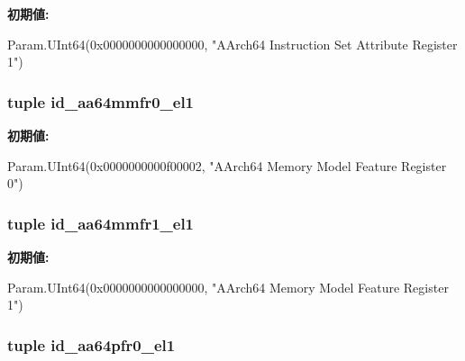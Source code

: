 \label{classArmISA_1_1ArmISA_af6b7dfad4c11bc8baa25694d43bfd3e5}
{\bfseries 初期値:}
\begin{DoxyCode}
Param.UInt64(0x0000000000000000,
        "AArch64 Instruction Set Attribute Register 1")
\end{DoxyCode}
\hypertarget{classArmISA_1_1ArmISA_a9b9694e4a3282d096698500d588e8bbf}{
\subsubsection[{id\_\-aa64mmfr0\_\-el1}]{\setlength{\rightskip}{0pt plus 5cm}tuple {\bf id\_\-aa64mmfr0\_\-el1}}}
\label{classArmISA_1_1ArmISA_a9b9694e4a3282d096698500d588e8bbf}
{\bfseries 初期値:}
\begin{DoxyCode}
Param.UInt64(0x0000000000f00002,
        "AArch64 Memory Model Feature Register 0")
\end{DoxyCode}
\hypertarget{classArmISA_1_1ArmISA_a9d4cea762de219858576fe1aead51b89}{
\subsubsection[{id\_\-aa64mmfr1\_\-el1}]{\setlength{\rightskip}{0pt plus 5cm}tuple {\bf id\_\-aa64mmfr1\_\-el1}}}
\label{classArmISA_1_1ArmISA_a9d4cea762de219858576fe1aead51b89}
{\bfseries 初期値:}
\begin{DoxyCode}
Param.UInt64(0x0000000000000000,
        "AArch64 Memory Model Feature Register 1")
\end{DoxyCode}
\hypertarget{classArmISA_1_1ArmISA_a97479937aaafcc7638ff69bdb8ef3bf5}{
\subsubsection[{id\_\-aa64pfr0\_\-el1}]{\setlength{\rightskip}{0pt plus 5cm}tuple {\bf id\_\-aa64pfr0\_\-el1}}}
